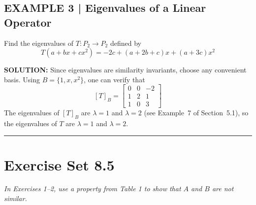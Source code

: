\documentclass{article}
\begin{document}
\subsection*{EXAMPLE 3 | Eigenvalues of a Linear Operator}

Find the eigenvalues of $T : P_2 \to P_2$ defined by
\[
  T(a + bx + cx^2) = -2c + (a+2b+c)x + (a+3c)x^2
\]

\textbf{SOLUTION:} Since eigenvalues are similarity invariants, choose any convenient basis.
Using $B = \{1, x, x^2\}$, one can verify that
\[
  [T]_B = \begin{bmatrix}0&0&-2\\1&2&1\\1&0&3\end{bmatrix}
\]
The eigenvalues of $[T]_B$ are $\lambda = 1$ and $\lambda = 2$ (see Example~7 of
Section~5.1), so the eigenvalues of $T$ are $\lambda = 1$ and $\lambda = 2$.

\vspace{3mm}
\noindent\rule{\linewidth}{0.5pt}

\section*{Exercise Set 8.5}

\noindent\textit{In Exercises 1--2, use a property from Table 1 to show that $A$ and $B$
are not similar.}
\end{document}
